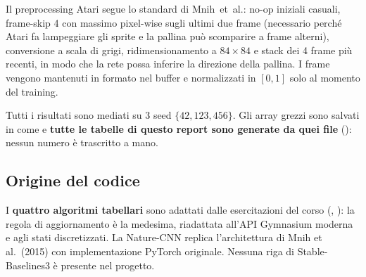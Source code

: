 Il preprocessing Atari segue lo standard di Mnih~et~al.: no-op iniziali casuali,
frame-skip 4 con massimo pixel-wise sugli ultimi due frame (necessario perch\'e Atari
fa lampeggiare gli sprite e la pallina pu\`o scomparire a frame alterni), conversione a
scala di grigi, ridimensionamento a $84{\times}84$ e stack dei 4 frame pi\`u recenti, in
modo che la rete possa inferire la direzione della pallina. I frame vengono mantenuti
in formato  nel buffer e normalizzati in $[0,1]$ solo al momento del
training.

Tutti i risultati sono mediati su 3 seed $\{42, 123, 456\}$.
Gli array grezzi sono salvati in  come  e \textbf{tutte le
tabelle di questo report sono generate da quei file}
(): nessun numero \`e trascritto a mano.

\subsection{Origine del codice}
\label{sec:code-origin}
I \textbf{quattro algoritmi tabellari} sono adattati dalle esercitazioni del corso
(, ): la regola di aggiornamento \`e la medesima,
riadattata all'API Gymnasium moderna e agli stati discretizzati. La
Nature-CNN replica l'architettura di Mnih et al.\ (2015) con implementazione PyTorch
originale. Nessuna riga di Stable-Baselines3 \`e presente nel progetto.
